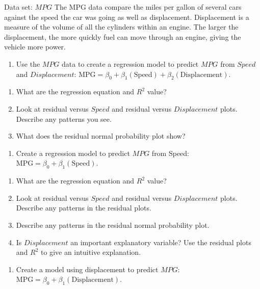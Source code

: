 \documentclass[
]{report}
\providecommand{\tightlist}{%
  \setlength{\itemsep}{0pt}\setlength{\parskip}{0pt}}
\begin{document}
Data set: \(MPG\)
The MPG data compare the miles per gallon of several cars against the speed the car was going as well as displacement. Displacement is a measure of the volume of all the cylinders within an engine. The larger the displacement, the more quickly fuel can move through an engine, giving the vehicle more power.

\begin{enumerate}
\def\labelenumi{\arabic{enumi}.}
\setcounter{enumi}{36}
\tightlist
\item
  Use the \(MPG\) data to create a regression model to predict \(MPG\) from \(Speed\) and \(Displacement\): \(\mathrm{MPG} = \beta_0 + \beta_1(\mathrm{Speed}) + \beta_2(\mathrm{Displacement}).\)
\end{enumerate}

\begin{enumerate}
\def\labelenumi{\alph{enumi}.}
\tightlist
\item
  What are the regression equation and \(R^2\) value?
\item
  Look at residual versus \(Speed\) and residual versus \(Displacement\) plots. Describe any patterns you see.
\item
  What does the residual normal probability plot show?
\end{enumerate}

\begin{enumerate}
\def\labelenumi{\arabic{enumi}.}
\setcounter{enumi}{37}
\tightlist
\item
  Create a regression model to predict \(MPG\) from Speed: \(\mathrm{MPG} = \beta_0 + \beta_1(\mathrm{Speed}).\)
\end{enumerate}

\begin{enumerate}
\def\labelenumi{\alph{enumi}.}
\tightlist
\item
  What are the regression equation and \(R^2\) value?
\item
  Look at residual versus \(Speed\) and residual versus \(Displacement\) plots. Describe any patterns in the residual plots.
\item
  Describe any patterns in the residual normal probability plot.
\item
  Is \(Displacement\) an important explanatory variable? Use the residual plots and \(R^2\) to give an intuitive explanation.
\end{enumerate}

\begin{enumerate}
\def\labelenumi{\arabic{enumi}.}
\setcounter{enumi}{38}
\tightlist
\item
  Create a model using displacement to predict \(MPG\): \(\mathrm{MPG} = \beta_0 + \beta_1(\mathrm{Displacement}).\)
\end{enumerate}
\end{document}
